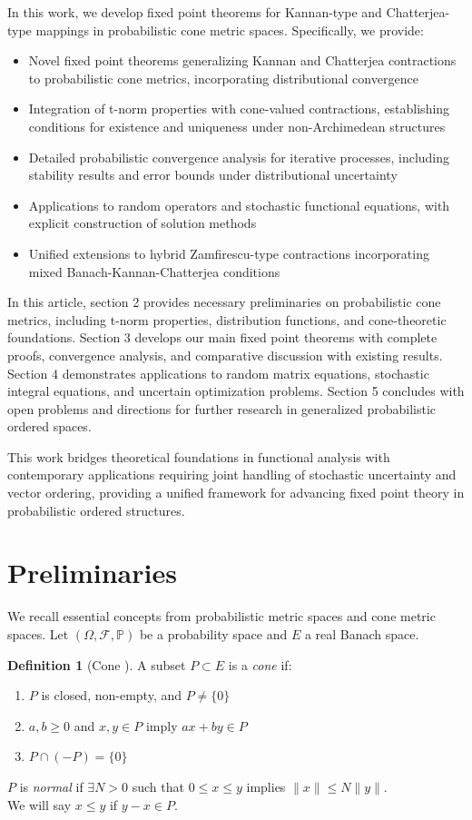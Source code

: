 \documentclass{amsart}
\theoremstyle{definition}
\newtheorem{definition}[theorem]{Definition}
\theoremstyle{remark}
\numberwithin{equation}{section}
\begin{document}
In this work, we develop fixed point theorems for Kannan-type and Chatterjea-type mappings in probabilistic cone metric spaces. Specifically, we provide:

\begin{itemize}
\item Novel fixed point theorems generalizing Kannan and Chatterjea contractions to probabilistic cone metrics, incorporating distributional convergence
\item Integration of t-norm properties with cone-valued contractions, establishing conditions for existence and uniqueness under non-Archimedean structures
\item Detailed probabilistic convergence analysis for iterative processes, including stability results and error bounds under distributional uncertainty
\item Applications to random operators and stochastic functional equations, with explicit construction of solution methods
\item Unified extensions to hybrid Zamfirescu-type contractions incorporating mixed Banach-Kannan-Chatterjea conditions
\end{itemize}

In this article, section 2 provides necessary preliminaries on probabilistic cone metrics, including t-norm properties, distribution functions, and cone-theoretic foundations. Section 3 develops our main fixed point theorems with complete proofs, convergence analysis, and comparative discussion with existing results. Section 4 demonstrates applications to random matrix equations, stochastic integral equations, and uncertain optimization problems. Section 5 concludes with open problems and directions for further research in generalized probabilistic ordered spaces.

This work bridges theoretical foundations in functional analysis with contemporary applications requiring joint handling of stochastic uncertainty and vector ordering, providing a unified framework for advancing fixed point theory in probabilistic ordered structures.

\section{Preliminaries}
We recall essential concepts from probabilistic metric spaces and cone metric spaces. Let $(\Omega, \mathcal{F}, \mathbb{P})$ be a probability space and $E$ a real Banach space.

\begin{definition}[Cone \cite{Huang2007}]
A subset $P \subset E$ is a \textit{cone} if:
\begin{enumerate}
    \item $P$ is closed, non-empty, and $P \neq \{0\}$
    \item $a,b \geq 0$ and $x,y \in P$ imply $ax + by \in P$
    \item $P \cap (-P) = \{0\}$
\end{enumerate}
$P$ is \textit{normal} if $\exists N > 0$ such that $0 \leq x \leq y$ implies $\|x\| \leq N\|y\|$.\\
We will say  $x \leq y$ if $y - x \in P$.
\end{definition}
\end{document}
